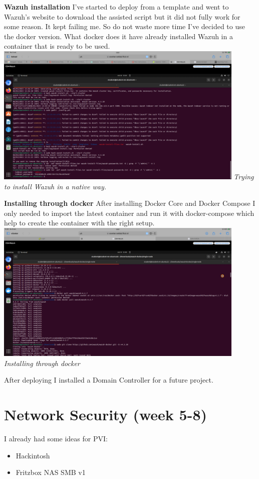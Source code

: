 \documentclass[12pt, letterpaper]{article}
\begin{document}
\textbf{Wazuh installation}
I've started to deploy from a template and went to Wazuh's website to download the assisted script but it did not fully work for some reason. It kept failing me. So do not waste more time I've decided to use the docker version. What docker does it have already installed Wazuh in a container that is ready to be used. 
\hfill\break
\includegraphics[width=0.9\textwidth]{fotos/Week 4/Trying to install wazuh native.png}
\break
\emph{Trying to install Wazuh in a native way.}

\hfill\break
\hfill\break
\textbf{Installing through docker}
\hfill\break
After installing Docker Core and Docker Compose I only needed to import the latest container and run it with docker-compose which help to create the container with the right setup.
\hfill\break
\includegraphics[width=0.9\textwidth]{fotos/Week 4/Wazuh docker install.png}
\break
\emph{Installing through docker}

After deploying I installed a Domain Controller for a future project. 
\newpage
\section{Network Security (week 5-8)}
I already had some ideas for PVI:
\begin{itemize}
    \item Hackintosh
    \item Fritzbox NAS SMB v1
\end{itemize}
\end{document}
